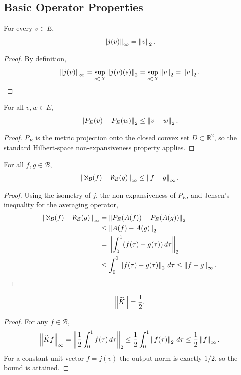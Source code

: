 \subsection{Basic Operator Properties}

\begin{lemma}
For every $v\in E$,
\[
\left\lVert j(v) \right\rVert_\infty=\left\lVert v \right\rVert_2.
\]
\end{lemma}

\begin{proof}
By definition,
\[
\left\lVert j(v) \right\rVert_\infty=\sup_{s\in X}\left\lVert j(v)(s) \right\rVert_2
=\sup_{s\in X}\left\lVert v \right\rVert_2
=\left\lVert v \right\rVert_2.
\]
\end{proof}

\begin{lemma}\label{lem:disk-projection}
For all $v,w\in E$,
\[
\left\lVert P_E(v)-P_E(w) \right\rVert_2\le \left\lVert v-w \right\rVert_2.
\]
\end{lemma}

\begin{proof}
$P_E$ is the metric projection onto the closed convex set $D\subset \mathbb{R}^2$, so the standard Hilbert-space non-expansiveness property applies.
\end{proof}

\begin{lemma}
For all $f,g\in\mathcal{B}$,
\[
\left\lVert \aleph_{\mathcal B}(f)-\aleph_{\mathcal B}(g) \right\rVert_\infty\le \left\lVert f-g \right\rVert_\infty.
\]
\end{lemma}

\begin{proof}
Using the isometry of $j$, the non-expansiveness of $P_E$, and Jensen's inequality for the averaging operator,
\begin{align*}
\left\lVert \aleph_{\mathcal B}(f)-\aleph_{\mathcal B}(g) \right\rVert_\infty
&=
\left\lVert P_E(A(f))-P_E(A(g)) \right\rVert_2 \\
&\le \left\lVert A(f)-A(g) \right\rVert_2 \\
&=
\left\|\int_0^1 (f(\tau)-g(\tau))\,d\tau\right\|_2 \\
&\le \int_0^1 \left\lVert f(\tau)-g(\tau) \right\rVert_2\,d\tau
\le \left\lVert f-g \right\rVert_\infty.
\end{align*}
\end{proof}

\begin{lemma}
\[
\left\lVert \widetilde K \right\rVert=\frac{1}{2}.
\]
\end{lemma}

\begin{proof}
For any $f\in\mathcal{B}$,
\[
\left\lVert \widetilde Kf \right\rVert_\infty
=
\left\|\frac{1}{2}\int_0^1 f(\tau)\,d\tau\right\|_2
\le \frac{1}{2}\int_0^1 \left\lVert f(\tau) \right\rVert_2\,d\tau
\le \frac{1}{2}\left\lVert f \right\rVert_\infty.
\]
For a constant unit vector $f=j(v)$ the output norm is exactly $1/2$, so the bound is attained.
\end{proof}

